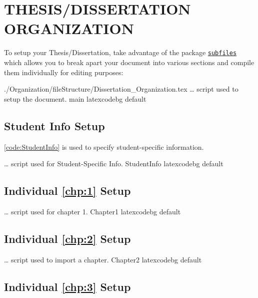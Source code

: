 \documentclass[../Dissertation]{subfiles}
\begin{document}
\chapter[\uppercase{Thesis/Dissertation
Organization}]{\uppercase{Thesis/Dissertation \protect\\Organization}}

    To setup your Thesis/Dissertation, take advantage of the 
    package \href{https://ctan.org/pkg/subfiles}{\texttt{subfiles}} which
    allows you to break apart your document into various sections and compile
    them individually for editing purposes:
    
        {./Organization/fileStructure/Dissertation_Organization.tex} %
        {\ldots {} script used to setup the document.}
        {main}
        {\footnotesize}
        {latexcodebg}
        {default}

\section{Student Info Setup}
    \cref{code:StudentInfo} is used to specify student-specific information.  
    
        {}
        {\ldots {} script used for Student-Specific Info.}
        {StudentInfo}
        {\footnotesize}
        {latexcodebg}
        {default}

\section{Individual \cref{chp:1} Setup}

        {}
        {\ldots {} script used for chapter 1.}
        {Chapter1}
        {\footnotesize}
        {latexcodebg}
        {default}

\section{Individual \cref{chp:2} Setup}

        {}
        {\ldots {} script used to import a chapter.}
        {Chapter2}
        {\footnotesize}
        {latexcodebg}
        {default}

\section{Individual \cref{chp:3} Setup}
\end{document}
